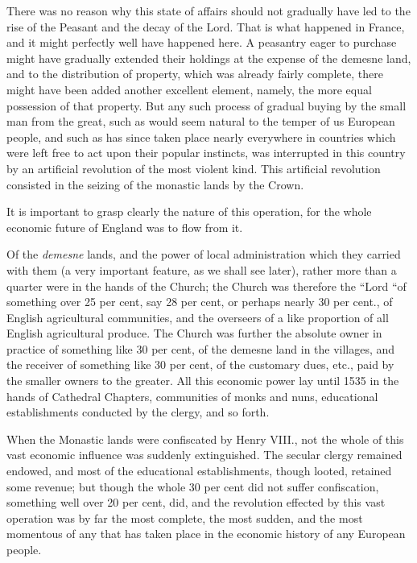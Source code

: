 \documentclass{book}
\begin{document}
There was no reason why this state of affairs should not gradually have led to the rise of the Peasant and the decay of the Lord. That is what happened in France, and it might perfectly well have happened here. A peasantry eager to purchase might have gradually extended their holdings at the expense of the demesne land, and to the distribution of property, which was already fairly complete, there might have been added another excellent element, namely, the more equal possession of that property. But any such process of gradual buying by the small man from the great, such as would seem natural to the temper of us European people, and such as has since taken place nearly everywhere in countries which were left free to act upon their popular instincts, was interrupted in this country by an artificial revolution of the most violent kind. This artificial revolution consisted in the seizing of the monastic lands by the Crown.

It is important to grasp clearly the nature of this operation, for the whole economic future of England was to flow from it.

Of the \emph{demesne} lands, and the power of local administration which they carried with them (a very important feature, as we shall see later), rather more than a quarter were in the hands of the Church; the Church was therefore the “Lord “of something over 25 per cent, say 28 per cent, or perhaps nearly 30 per cent., of English agricultural communities, and the overseers of a like proportion of all English agricultural produce. The Church was further the absolute owner in practice of something like 30 per cent, of the demesne land in the villages, and the receiver of something like 30 per cent, of the customary dues, etc., paid by the smaller owners to the greater. All this economic power lay until 1535 in the hands of Cathedral Chapters, communities of monks and nuns, educational establishments conducted by the clergy, and so forth.

When the Monastic lands were confiscated by Henry VIII., not the whole of this vast economic influence was suddenly extinguished. The secular clergy remained endowed, and most of the educational establishments, though looted, retained some revenue; but though the whole 30 per cent did not suffer confiscation, something well over 20 per cent, did, and the revolution effected by this vast operation was by far the most complete, the most sudden, and the most momentous of any that has taken place in the economic history of any European people.
\end{document}
